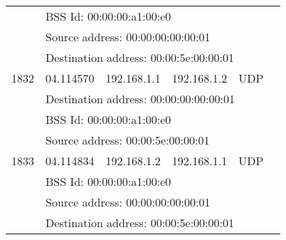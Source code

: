 \begin{center}
\begin{longtable}{|llllll|}
    	&	\multicolumn{5}{l|}{BSS Id: 00:00:00:a1:00:e0} \\
    	& \multicolumn{5}{l|}{Source address: 00:00:00:00:00:01} \\
      & \multicolumn{5}{l|}{Destination address: 00:00:5e:00:00:01} \\
			\hline
   1832  & 04.114570  & 192.168.1.1 & 192.168.1.2 & UDP & \\
      & \multicolumn{5}{l|}{Destination address: 00:00:00:00:00:01} \\
    	&	\multicolumn{5}{l|}{BSS Id: 00:00:00:a1:00:e0} \\
    	& \multicolumn{5}{l|}{Source address: 00:00:5e:00:00:01} \\
			\hline
   1833  & 04.114834  & 192.168.1.2 & 192.168.1.1 & UDP & \\
    	&	\multicolumn{5}{l|}{BSS Id: 00:00:00:a1:00:e0} \\
    	& \multicolumn{5}{l|}{Source address: 00:00:00:00:00:01} \\
      & \multicolumn{5}{l|}{Destination address: 00:00:5e:00:00:01} \\
			\hline
		\end{longtable}
	\end{center}
